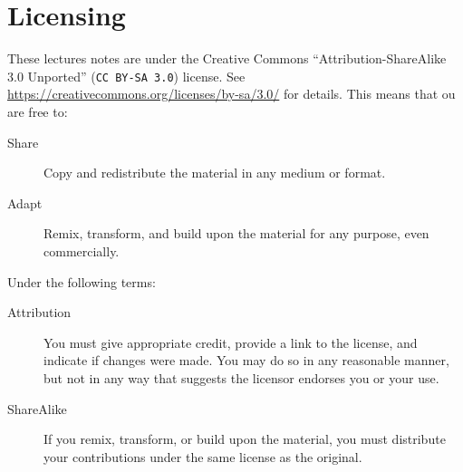 \documentclass[draft=false,           %
               paper=a4,              %
               fontsize=11pt,         %
               headings=big,
               twocolumn=false,       %
               twoside,               %
               openright,             %
               chapterprefix,         %
               cleardoublepage=plain, %
               parskip=false,
               numbers=noenddot        %
              ]{scrbook}
\begin{document}
\section*{Licensing}
These lectures notes are under the Creative Commons ``Attribution-ShareAlike 3.0 Unported'' (\texttt{CC BY-SA 3.0}) license. See \url{https://creativecommons.org/licenses/by-sa/3.0/} for details. This means that ou are free to:

\begin{description}
 \item[Share] Copy and redistribute the material in any medium or format.
 \item[Adapt] Remix, transform, and build upon the material for any purpose, even commercially.
\end{description}

\noindent Under the following terms:

\begin{description}
 
 \item[Attribution] You must give appropriate credit, provide a link to the license, and indicate if changes were made. You may do so in any reasonable manner, but not in any way that suggests the licensor endorses you or your use.

 \item[ShareAlike] If you remix, transform, or build upon the material, you must distribute your contributions under the same license as the original. 

\end{description}










\end{document}
